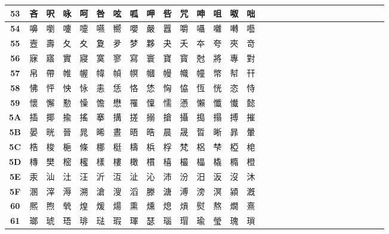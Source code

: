 \begin{table}[H]
\begin{tabular}{|Sc|Sc|Sc|Sc|Sc|Sc|Sc|Sc|Sc|Sc|Sc|Sc|Sc|Sc|Sc|}
\textbf{53} & 吝 & 呎 & 咏 & 呵 & 咎 & 呟 & 呱 & 呷 & 呰 & 咒 & 呻 & 咀 & 呶 & 咄 \\ \hline
\textbf{54} & 嚊 & 嚠 & 嚔 & 嚏 & 嚥 & 嚮 & 嚶 & 嚴 & 囂 & 嚼 & 囁 & 囃 & 囀 & 囈 \\ \hline
\textbf{55} & 壼 & 壽 & 夂 & 夊 & 夐 & 夛 & 梦 & 夥 & 夬 & 夭 & 夲 & 夸 & 夾 & 竒 \\ \hline
\textbf{56} & 寐 & 寤 & 實 & 寢 & 寞 & 寥 & 寫 & 寰 & 寶 & 寳 & 尅 & 將 & 專 & 對 \\ \hline
\textbf{57} & 帛 & 帶 & 帷 & 幄 & 幃 & 幀 & 幎 & 幗 & 幔 & 幟 & 幢 & 幤 & 幇 & 幵 \\ \hline
\textbf{58} & 怫 & 怦 & 怏 & 怺 & 恚 & 恁 & 恪 & 恷 & 恟 & 恊 & 恆 & 恍 & 恣 & 恃 \\ \hline
\textbf{59} & 懷 & 懈 & 懃 & 懆 & 憺 & 懋 & 罹 & 懍 & 懦 & 懣 & 懶 & 懺 & 懴 & 懿 \\ \hline
\textbf{5A} & 插 & 揶 & 揄 & 搖 & 搴 & 搆 & 搓 & 搦 & 搶 & 攝 & 搗 & 搨 & 搏 & 摧 \\ \hline
\textbf{5B} & 晏 & 晄 & 晉 & 晁 & 晞 & 晝 & 晤 & 晧 & 晨 & 晟 & 晢 & 晰 & 暃 & 暈 \\ \hline
\textbf{5C} & 梏 & 梭 & 梔 & 條 & 梛 & 梃 & 檮 & 梹 & 桴 & 梵 & 梠 & 梺 & 椏 & 梍 \\ \hline
\textbf{5D} & 槫 & 樊 & 樒 & 櫁 & 樣 & 樓 & 橄 & 樌 & 橲 & 樶 & 橸 & 橇 & 橢 & 橙 \\ \hline
\textbf{5E} & 汞 & 汕 & 汢 & 汪 & 沂 & 沍 & 沚 & 沁 & 沛 & 汾 & 汨 & 汳 & 沒 & 沐 \\ \hline
\textbf{5F} & 溷 & 滓 & 溽 & 溯 & 滄 & 溲 & 滔 & 滕 & 溏 & 溥 & 滂 & 溟 & 潁 & 漑 \\ \hline
\textbf{60} & 熈 & 煦 & 煢 & 煌 & 煖 & 煬 & 熏 & 燻 & 熄 & 熕 & 熨 & 熬 & 燗 & 熹 \\ \hline
\textbf{61} & 瑯 & 琥 & 珸 & 琲 & 琺 & 瑕 & 琿 & 瑟 & 瑙 & 瑁 & 瑜 & 瑩 & 瑰 & 瑣 \\ \hline
\end{tabular}
\end{table}

